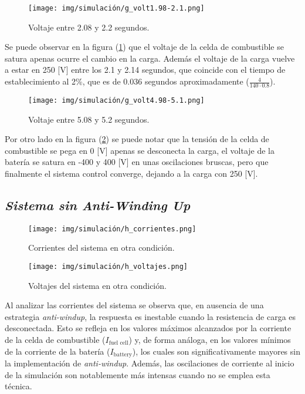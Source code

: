 
\begin{figure}[H]
    \centering
    \texttt{[image: img/simulación/g\_volt1.98-2.1.png]}
    \caption{Voltaje entre 2.08 y 2.2 segundos.}
    \label{fig:g_volt1.98-2.1}
\end{figure}

Se puede observar en la figura (\ref{fig:g_volt1.98-2.1}) que el voltaje de la celda de 
combustible se satura apenas ocurre el cambio en la carga. Además el voltaje de la carga
vuelve a estar en 250 [V] entre los 2.1 y 2.14 segundos, que coincide con el tiempo de
establecimiento al 2\%, que es de 0.036 segundos aproximadamente ($\frac{4}{140\cdot0.8}$).

\begin{figure}[H]
    \centering
    \texttt{[image: img/simulación/g\_volt4.98-5.1.png]}
    \caption{Voltaje entre 5.08 y 5.2 segundos.}
    \label{fig:g_volt4.98-5.1}
\end{figure}

Por otro lado en la figura (\ref{fig:g_volt4.98-5.1}) se puede notar que la tensión de la 
celda de combustible se pega en 0 [V] apenas se desconecta la carga, el voltaje de la batería
se satura en -400 y 400 [V] en unas oscilaciones bruscas, pero que finalmente el sistema
control converge, dejando a la carga con 250 [V].

\subsection{\textit{Sistema sin Anti-Winding Up}}

\begin{figure}[H]
    \centering
    \texttt{[image: img/simulación/h\_corrientes.png]}
    \caption{Corrientes del sistema en otra condición.}
    \label{fig:h_corrientes}
\end{figure}

\begin{figure}[H]
    \centering
    \texttt{[image: img/simulación/h\_voltajes.png]}
    \caption{Voltajes del sistema en otra condición.}
    \label{fig:h_voltajes}
\end{figure}
Al analizar las corrientes del sistema se observa que, en ausencia de una estrategia 
\textit{anti-windup}, la respuesta es inestable cuando la resistencia de carga es desconectada.
Esto se refleja en los valores máximos alcanzados por la corriente de la celda de 
combustible ($I_{\text{fuel cell}}$) y, de forma análoga, en los valores 
mínimos de la corriente de la batería ($I_{\text{battery}}$), los cuales son significativamente 
mayores sin la implementación de \textit{anti-windup}. Además, las oscilaciones de corriente 
al inicio de la simulación son notablemente más intensas cuando no se emplea esta técnica.

